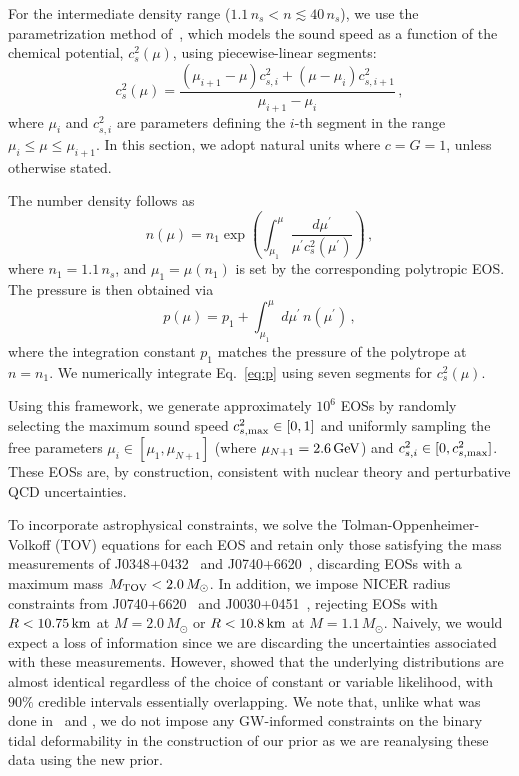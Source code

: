 \documentclass[twocolumn,linenumbers]{aastex631}
\begin{document}
For the intermediate density range ($1.1\,n_s < n \lesssim 40\,n_s$), we
use the parametrization method of~\citet{Annala2019}, which models the
sound speed as a function of the chemical potential, $c_s^2(\mu)$, using
piecewise-linear segments:
%
\begin{equation} \label{eq:cs2}
 c_s^2(\mu) = \frac{\left(\mu_{i+1}-\mu \right) c_{s,i}^2 + \left(\mu -
   \mu_i \right) c_{s,i+1}^2}{\mu_{i+1}-\mu_i}\,,
\end{equation}
%
where $\mu_i$ and $c_{s,i}^2$ are parameters defining the $i$-th segment
in the range $\mu_i \leq \mu \leq \mu_{i+1}$. In this section, we
adopt natural units where $c=G=1$, unless otherwise stated.

The number density follows as 
%
\begin{equation} \label{eq:n}
 n(\mu) = n_1 \exp \left({\int_{\mu_1}^\mu \frac{d\mu^\prime}{\mu^\prime
     c_s^2(\mu^\prime)}}\right)\,,
\end{equation} 
%
where $n_1 = 1.1\,n_s$, and $\mu_1 = \mu(n_1)$ is set by the
corresponding polytropic EOS. The pressure is then obtained via
%
\begin{equation} \label{eq:p}
 p(\mu) = p_1 + \int_{\mu_1}^\mu d\mu^\prime \, n(\mu^\prime)\,,
\end{equation}
%
where the integration constant $p_1$ matches the pressure of the
polytrope at $n = n_1$. We numerically integrate Eq.~\eqref{eq:p} using
seven segments for $c_s^2(\mu)$.

Using this framework, we generate approximately $10^6$ EOSs by randomly
selecting the maximum sound speed $c_{s,{\rm max}}^2 \in [0,1]$ and
uniformly sampling the free parameters $\mu_i \in [\mu_1, \mu_{N+1}]$
(where $\mu_{N+1} = 2.6\,\rm GeV$) and $c_{s,i}^2 \in [0, c_{s,{\rm
      max}}^2]$. These EOSs are, by construction, consistent with
nuclear theory and perturbative QCD uncertainties.

To incorporate astrophysical constraints, we solve the
Tolman-Oppenheimer-Volkoff (TOV) equations for each EOS and retain only
those satisfying the mass measurements of J0348+0432~\citep[][$M =
  2.01\pm 0.04\,M_{\odot}$]{Antoniadis2013} and J0740+6620~\citep[][$M =
  2.08 \pm 0.07\,M_{\odot}$]{Cromartie2019, Fonseca2021}, discarding EOSs
with a maximum mass $M_{\rm TOV} < 2.0\,M_{\odot}$. In addition, we
impose NICER radius constraints from J0740+6620~\citep{Miller2021,
  Riley2021} and J0030+0451~\citep{Riley2019, MCMiller2019b}, rejecting
EOSs with $R < 10.75\,\rm km$ at $M = 2.0\,M_{\odot}$ or $R < 10.8\,\rm
km$ at $M = 1.1\,M_{\odot}$.  Naively, we would expect a loss of
information since we are discarding the uncertainties associated with
these measurements.  However, \citet{2023Jiang} showed that the
underlying distributions are almost identical regardless of the choice of
constant or variable likelihood, with $90\%$ credible intervals
essentially overlapping.  We note that, unlike what was done
in~\citet{Altiparmak:2022} and \citet{Ecker:2022dlg}, we do not impose
any GW-informed constraints on the binary tidal deformability in the
construction of our prior as we are reanalysing these data using the new
prior.
	
\end{document}

